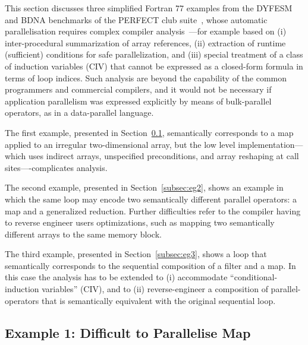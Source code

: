 This section discusses three simplified Fortran 77 examples from the
DYFESM and BDNA benchmarks of the PERFECT club
suite~\cite{Berry88theperfect}, whose automatic parallelisation
requires complex compiler
analysis~\cite{CosPLDI,CIVan,OanceaMon}---for example based on (i)
inter-procedural summarization of array references, (ii) extraction of
runtime (sufficient) conditions for safe parallelization, and (iii)
special treatment of a class of induction variables (CIV) that cannot
be expressed as a closed-form formula in terms of loop indices.
%
Such analysis are beyond the capability of the common programmers and
commercial compilers, and it would not be necessary if application
parallelism was expressed explicitly by means of bulk-parallel
operators, as in a data-parallel language.

The first example, presented in Section~\ref{subsec:eg1}, semantically
corresponds to a map applied to an irregular two-dimensional array,
but the low level implementation---which uses indirect arrays,
unspecified preconditions, and array reshaping at call
sites----complicates analysis.

The second example, presented in Section~\ref{subsec:eg2}, shows an
example in which the same loop may encode two semantically different
parallel operators: a map and a generalized reduction.  Further
difficulties refer to the compiler having to reverse engineer users
optimizations, such as mapping two semantically different arrays to
the same memory block.

The third example, presented in Section~\ref{subsec:eg3}, shows a loop
that semantically corresponds to the sequential composition of a
filter and a map.  In this case the analysis has to be extended to (i)
accommodate ``conditional-induction variables'' (CIV), and to (ii)
reverse-engineer a composition of parallel-operators that is
semantically equivalent with the original sequential loop.

\subsection{Example 1: Difficult to Parallelise Map}
\label{subsec:eg1}

